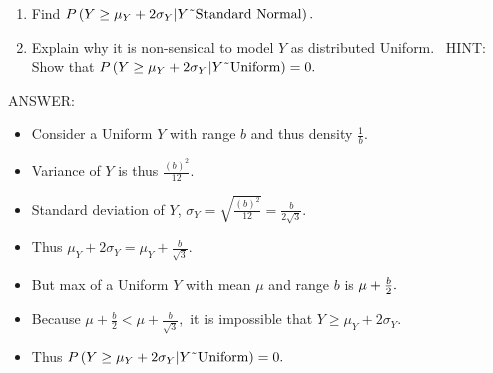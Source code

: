 \documentclass[11pt]{article}
\begin{document}
\begin{enumerate}
\begin{enumerate}
\begin{enumerate}
\item Find \thinspace $P\left( Y\geq \mu _{Y}+2\sigma _{Y}|Y\symbol{126}%
\text{Standard Normal}\right) .$

\item Explain why it is non-sensical to model $Y$ as distributed Uniform. \
HINT: Show that \thinspace $P\left( Y\geq \mu _{Y}+2\sigma _{Y}|Y\symbol{126}%
\text{Uniform}\right) =0.$
\end{enumerate}
\end{enumerate}
\end{enumerate}

ANSWER:

\begin{itemize}
\item Consider a Uniform $Y$ with range $b$ and thus density $\frac{1}{b}.$

\item Variance of $Y$ is thus $\frac{\left( b\right) ^{2}}{12}.$

\item Standard deviation of $Y$, $\sigma _{Y}=\sqrt{\frac{\left( b\right)
^{2}}{12}}=\frac{b}{2\sqrt{3}}.$

\item Thus $\mu _{Y}+2\sigma _{Y}=\mu _{Y}+\frac{b}{\sqrt{3}}.$

\item But max of a Uniform $Y$ with mean $\mu $ and range $b$ is $\mu +\frac{%
b}{2}.$

\item Because $\mu +\frac{b}{2}<\mu +\frac{b}{\sqrt{3}},$ it is impossible
that $Y\geq \mu _{Y}+2\sigma _{Y}.$

\item Thus $P\left( Y\geq \mu _{Y}+2\sigma _{Y}|Y\symbol{126}\text{Uniform}%
\right) =0.$ 
\end{itemize}
\end{document}
